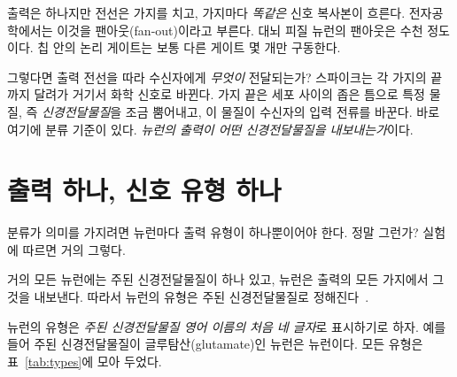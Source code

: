 출력은 하나지만 전선은 가지를 치고, 가지마다 \emph{똑같은} 신호 복사본이 흐른다. 전자공학에서는 이것을 팬아웃(fan-out)이라고 부른다. 대뇌 피질 뉴런의 팬아웃은 수천 정도이다. 칩 안의 논리 게이트는 보통 다른 게이트 몇 개만 구동한다.

그렇다면 출력 전선을 따라 수신자에게 \emph{무엇이} 전달되는가? 스파이크는 각 가지의 끝까지 달려가 거기서 화학 신호로 바뀐다. 가지 끝은 세포 사이의 좁은 틈으로 특정 물질, 즉 \emph{신경전달물질}을 조금 뿜어내고, 이 물질이 수신자의 입력 전류를 바꾼다. 바로 여기에 분류 기준이 있다. \emph{뉴런의 출력이 어떤 신경전달물질을 내보내는가}이다.

\section{출력 하나, 신호 유형 하나}

분류가 의미를 가지려면 뉴런마다 출력 유형이 하나뿐이어야 한다. 정말 그런가? 실험에 따르면 거의 그렇다.

\begin{keyblock}
\begin{proposition}[뉴런 하나, 출력 유형 하나]
\label{prop:dale}
거의 모든 뉴런에는 주된 신경전달물질이 하나 있고, 뉴런은 출력의 모든 가지에서 그것을 내보낸다. 따라서 뉴런의 유형은 주된 신경전달물질로 정해진다~\cite{Strata1999}.
\end{proposition}
\end{keyblock}

뉴런의 유형은 \emph{주된 신경전달물질 영어 이름의 처음 네 글자}로 표시하기로 하자. 예를 들어 주된 신경전달물질이 글루탐산(glutamate)인 뉴런은  뉴런이다. 모든 유형은 표~\ref{tab:types}에 모아 두었다.

